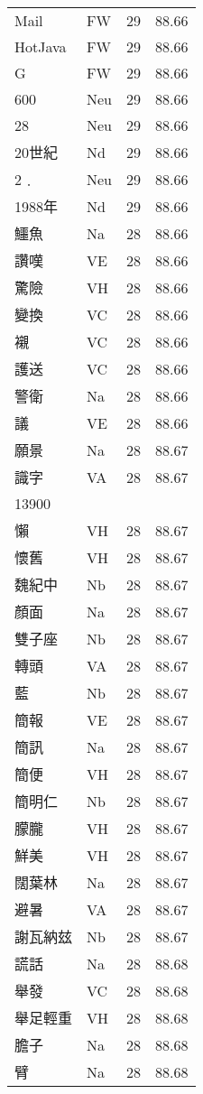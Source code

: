 \documentclass[twocolumn]{book}
\begin{document}
\begin{supertabular}{llrr}
Mail & FW & 29 &  88.66\\
HotJava & FW & 29 &  88.66\\
G & FW & 29 &  88.66\\
600 & Neu & 29 &  88.66\\
28 & Neu & 29 &  88.66\\
20世紀 & Nd & 29 &  88.66\\
2﹒ & Neu & 29 &  88.66\\
1988年 & Nd & 29 &  88.66\\
鱷魚 & Na & 28 &  88.66\\
讚嘆 & VE & 28 &  88.66\\
驚險 & VH & 28 &  88.66\\
變換 & VC & 28 &  88.66\\
襯 & VC & 28 &  88.66\\
護送 & VC & 28 &  88.66\\
警衛 & Na & 28 &  88.66\\
議 & VE & 28 &  88.66\\
願景 & Na & 28 &  88.67\\
識字 & VA & 28 &  88.67\\
13900\\
懶 & VH & 28 &  88.67\\
懷舊 & VH & 28 &  88.67\\
魏紀中 & Nb & 28 &  88.67\\
顏面 & Na & 28 &  88.67\\
雙子座 & Nb & 28 &  88.67\\
轉頭 & VA & 28 &  88.67\\
藍 & Nb & 28 &  88.67\\
簡報 & VE & 28 &  88.67\\
簡訊 & Na & 28 &  88.67\\
簡便 & VH & 28 &  88.67\\
簡明仁 & Nb & 28 &  88.67\\
朦朧 & VH & 28 &  88.67\\
鮮美 & VH & 28 &  88.67\\
闊葉林 & Na & 28 &  88.67\\
避暑 & VA & 28 &  88.67\\
謝瓦納玆 & Nb & 28 &  88.67\\
謊話 & Na & 28 &  88.68\\
舉發 & VC & 28 &  88.68\\
舉足輕重 & VH & 28 &  88.68\\
膽子 & Na & 28 &  88.68\\
臂 & Na & 28 &  88.68\\

\end{supertabular}
\end{document}
